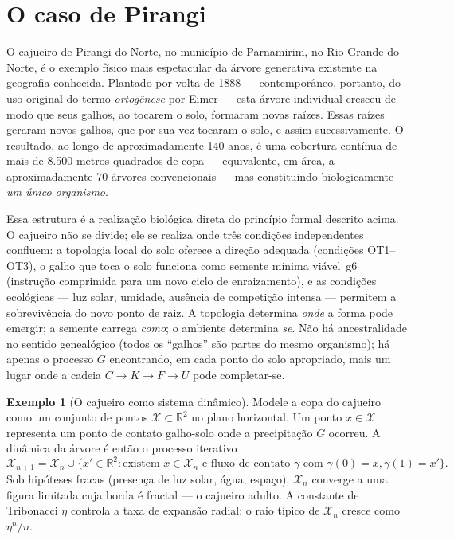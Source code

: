 \documentclass[12pt,a4paper,twoside]{book}
\theoremstyle{plain}
\theoremstyle{definition}
\theoremstyle{definition}
\newtheorem{exemplo}[teorema]{Exemplo}
\newcommand{\R}{\mathbb{R}}
\newcommand{\tribo}{\eta}
\begin{document}
\section{O caso de Pirangi}

O cajueiro de Pirangi do Norte, no município de Parnamirim, no Rio Grande
do Norte, é o exemplo físico mais espetacular da árvore generativa
existente na geografia conhecida. Plantado por volta de 1888 ---
contemporâneo, portanto, do uso original do termo \emph{ortogênese} por
Eimer --- esta árvore individual cresceu de modo que seus galhos,
ao tocarem o solo, formaram novas raízes. Essas raízes geraram novos
galhos, que por sua vez tocaram o solo, e assim sucessivamente. O
resultado, ao longo de aproximadamente 140 anos, é uma cobertura
contínua de mais de 8.500 metros quadrados de copa --- equivalente,
em área, a aproximadamente 70 árvores convencionais --- mas constituindo
biologicamente \emph{um único organismo}.

Essa estrutura é a realização biológica direta do princípio formal
descrito acima. O cajueiro não se divide; ele se realiza onde três
condições independentes confluem: a topologia local do solo oferece a
direção adequada (condições OT1--OT3), o galho que toca o solo funciona
como semente mínima viável~g6 (instrução comprimida para um novo ciclo
de enraizamento), e as condições ecológicas --- luz solar, umidade,
ausência de competição intensa --- permitem a sobrevivência do novo
ponto de raiz. A topologia determina \emph{onde} a forma pode emergir;
a semente carrega \emph{como}; o ambiente determina \emph{se}. Não há
ancestralidade no sentido genealógico (todos os ``galhos'' são partes
do mesmo organismo); há apenas o processo $G$ encontrando, em cada ponto
do solo apropriado, mais um lugar onde a cadeia $C \to K \to F \to U$
pode completar-se.

\begin{exemplo}[O cajueiro como sistema dinâmico]\label{ex:cajueiro-din}
Modele a copa do cajueiro como um conjunto de pontos $\mathcal{X} \subset \R^{2}$
no plano horizontal. Um ponto $x \in \mathcal{X}$ representa um ponto de
contato galho-solo onde a precipitação $G$ ocorreu. A dinâmica da árvore
é então o processo iterativo
\[
  \mathcal{X}_{n+1} = \mathcal{X}_{n} \cup \{ x' \in \R^{2} :
    \text{existem } x \in \mathcal{X}_{n} \text{ e fluxo de contato }
    \gamma \text{ com } \gamma(0)=x, \gamma(1)=x' \}.
\]
Sob hipóteses fracas (presença de luz solar, água, espaço), $\mathcal{X}_{n}$
converge a uma figura limitada cuja borda é fractal --- o cajueiro adulto.
A constante de Tribonacci $\tribo$ controla a taxa de expansão radial:
o raio típico de $\mathcal{X}_{n}$ cresce como $\tribo^{n}/n$.
\end{exemplo}
\end{document}
